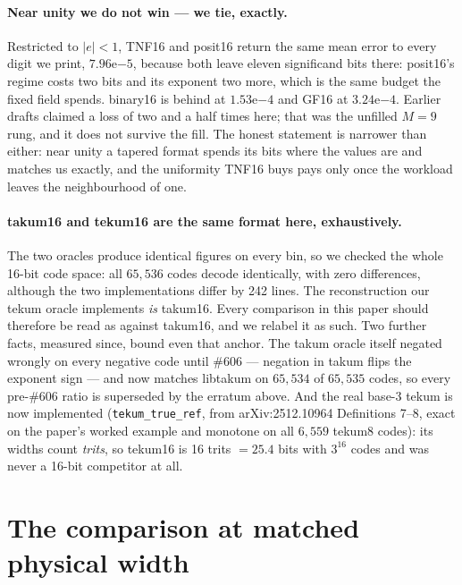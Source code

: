 \paragraph{Near unity we do not win --- we tie, exactly.} Restricted to
$|e|<1$, TNF16 and posit16 return the same mean error to every digit we print,
$7.96\mathrm{e}{-5}$, because both leave eleven significand bits there: posit16's
regime costs two bits and its exponent two more, which is the same budget the
fixed field spends. binary16 is behind at $1.53\mathrm{e}{-4}$ and GF16 at
$3.24\mathrm{e}{-4}$. Earlier drafts claimed a loss of two and a half times here;
that was the unfilled $M{=}9$ rung, and it does not survive the fill. The honest
statement is narrower than either: near unity a tapered format spends its bits
where the values are and matches us exactly, and the uniformity TNF16 buys pays
only once the workload leaves the neighbourhood of one.

\paragraph{takum16 and tekum16 are the same format here, exhaustively.} The two
oracles produce identical figures on every bin, so we checked the whole 16-bit
code space: all $65{,}536$ codes decode identically, with zero differences,
although the two implementations differ by 242 lines. The reconstruction our
tekum oracle implements \emph{is} takum16. Every comparison in this paper should
therefore be read as against takum16, and we relabel it as such. Two further
facts, measured since, bound even that anchor. The takum oracle itself negated
wrongly on every negative code until \#606 --- negation in takum flips the
exponent sign --- and now matches libtakum on $65{,}534$ of $65{,}535$ codes,
so every pre-\#606 ratio is superseded by the erratum above. And the real
base-3 tekum is now implemented (\texttt{tekum\_true\_ref}, from
arXiv:2512.10964 Definitions 7--8, exact on the paper's worked example and
monotone on all $6{,}559$ tekum8 codes): its widths count \emph{trits}, so
tekum16 is 16 trits $= 25.4$ bits with $3^{16}$ codes and was never a 16-bit
competitor at all.


\section{The comparison at matched physical width}\label{sec:matchedwidth}

